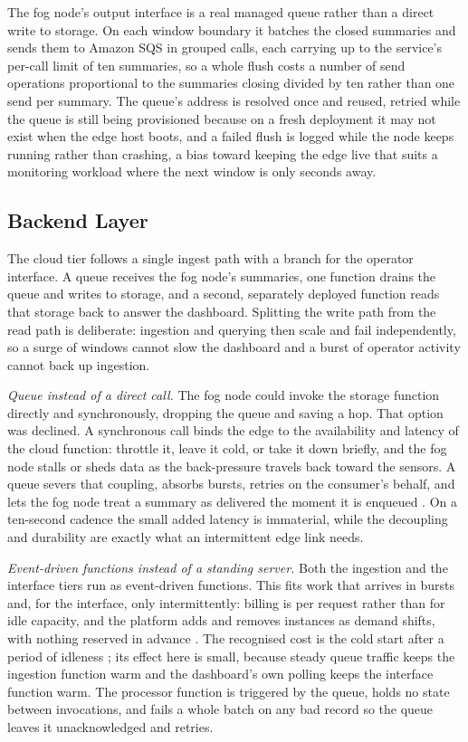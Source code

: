 \documentclass[conference]{IEEEtran}
\begin{document}
The fog node's output interface is a real managed queue rather than a direct write to storage. On each window boundary it batches the closed summaries and sends them to Amazon SQS in grouped calls, each carrying up to the service's per-call limit of ten summaries, so a whole flush costs a number of send operations proportional to the summaries closing divided by ten rather than one send per summary. The queue's address is resolved once and reused, retried while the queue is still being provisioned because on a fresh deployment it may not exist when the edge host boots, and a failed flush is logged while the node keeps running rather than crashing, a bias toward keeping the edge live that suits a monitoring workload where the next window is only seconds away.

\subsection{Backend Layer}

The cloud tier follows a single ingest path with a branch for the operator interface. A queue receives the fog node's summaries, one function drains the queue and writes to storage, and a second, separately deployed function reads that storage back to answer the dashboard. Splitting the write path from the read path is deliberate: ingestion and querying then scale and fail independently, so a surge of windows cannot slow the dashboard and a burst of operator activity cannot back up ingestion.

\textit{Queue instead of a direct call.} The fog node could invoke the storage function directly and synchronously, dropping the queue and saving a hop. That option was declined. A synchronous call binds the edge to the availability and latency of the cloud function: throttle it, leave it cold, or take it down briefly, and the fog node stalls or sheds data as the back-pressure travels back toward the sensors. A queue severs that coupling, absorbs bursts, retries on the consumer's behalf, and lets the fog node treat a summary as delivered the moment it is enqueued \cite{hohpe2003}. On a ten-second cadence the small added latency is immaterial, while the decoupling and durability are exactly what an intermittent edge link needs.

\textit{Event-driven functions instead of a standing server.} Both the ingestion and the interface tiers run as event-driven functions. This fits work that arrives in bursts and, for the interface, only intermittently: billing is per request rather than for idle capacity, and the platform adds and removes instances as demand shifts, with nothing reserved in advance \cite{armbrust2010}. The recognised cost is the cold start after a period of idleness \cite{wang2018}; its effect here is small, because steady queue traffic keeps the ingestion function warm and the dashboard's own polling keeps the interface function warm. The processor function is triggered by the queue, holds no state between invocations, and fails a whole batch on any bad record so the queue leaves it unacknowledged and retries.
\end{document}
